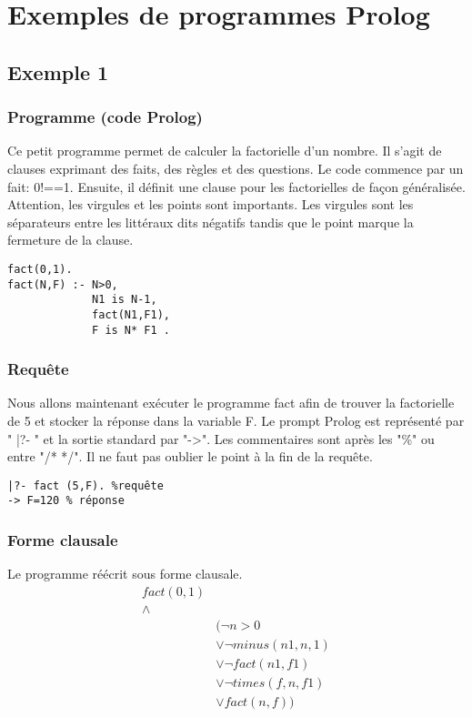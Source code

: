 \section{Exemples de programmes Prolog}

\subsection{Exemple 1}

\subsubsection{Programme (code Prolog)}
Ce petit programme permet de calculer la factorielle d'un nombre. Il s'agit de clauses exprimant des faits, des règles et des questions. Le code commence par un fait: 0!==1. Ensuite, il définit une clause pour les factorielles de façon généralisée. Attention, les virgules et les points sont importants. Les virgules sont les séparateurs entre les littéraux dits négatifs tandis que le point marque la fermeture de la clause.
\begin{verbatim}
fact(0,1).
fact(N,F) :- N>0, 
			 N1 is N-1,
			 fact(N1,F1), 
			 F is N* F1 .
\end{verbatim}
\subsubsection{Requête} Nous allons maintenant exécuter le programme fact afin de trouver la factorielle de 5 et stocker la réponse dans la variable F. Le prompt Prolog est représenté par " |?- " et la sortie standard par "->". Les commentaires sont après les "\%" ou entre "/* */". Il ne faut pas oublier le point à la fin de la requête.
\begin{verbatim} 
|?- fact (5,F). %requête
-> F=120 % réponse
\end{verbatim}

\subsubsection{Forme clausale}
Le programme réécrit sous forme clausale. 
\begin{align*}
fact(0,1) \\
 \wedge & \\
&( \neg n > 0 \\
&	\vee \neg minus( n1, n, 1) \\
&	\vee \neg fact(n1, f1) \\
&	\vee \neg times(f, n, f1) \\
&	\vee fact(n, f) ) \\
\end{align*}



